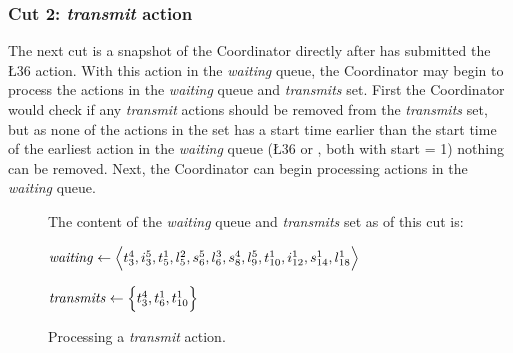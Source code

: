 \subsubsection{Cut 2: \textit{transmit} action}
The next cut is a snapshot of the Coordinator directly after  has submitted the \L{3}{6} action. With
this action in the \textit{waiting} queue, the Coordinator may begin to process the actions in the
\textit{waiting} queue and \textit{transmits} set. First the Coordinator would check if any \textit{transmit}
actions should be removed from the \textit{transmits} set, but as none of the actions in the set has a start
time earlier than the start time of the earliest action in the \textit{waiting} queue (\L{3}{6} or ,
both with start = 1) nothing can be removed. Next, the Coordinator can begin processing actions in the
\textit{waiting} queue. %

\begin{figure}[H]
    \caption{Processing a \textit{transmit} action.}\label{tikz:coordinatormsc2}
     \par

    \begin{minipage}[h]{14.5cm}
        The content of the \textit{waiting} queue and \textit{transmits} set as of this cut is: \smallbreak

        $\mathit{waiting} \leftarrow \Big\langle t^{4}_{3}, i^{5}_{3}, t^{1}_{5}, l^{2}_{5}, s^{5}_{6}, l^{3}_{6},
            s^{4}_{8}, l^{5}_{9}, t^{1}_{10}, i^{1}_{12}, s^{1}_{14}, l^{1}_{18} \Big\rangle$

        $\mathit{transmits} \leftarrow \Big\{ t^{4}_{3}, t^{1}_{6}, t^{1}_{10} \Big\}$
    \end{minipage}
\end{figure}


